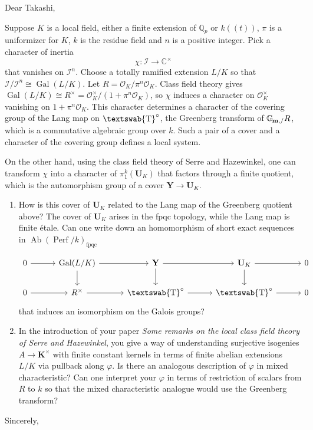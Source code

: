 \documentclass{letter}
\newcommand{\CC}{{\mathbb{C}}}
\newcommand{\OK}{\mathcal{O}_K}
\newcommand{\Qp}{\mathbb{Q}_p}
\newcommand{\mathswab}[1]{\operatorname{\textswab{#1}}}
\newcommand{\Gm}[1]{\mathbb{G}_{\hskip-1pt\textbf{m},#1}}
\newcommand{\GN}[1]{\mathswab{#1}}
\DeclareMathOperator{\Gal}{Gal}
\newcommand{\UK}{\mathbf{U}_K}
\newcommand{\Kx}{\mathbf{K}^\times}
\newcommand{\Y}{\mathbf{Y}}
\newcommand{\I}{\mathcal{I}}
\newcommand{\lp}{(\!(}
\newcommand{\rp}{)\!)}
\begin{document}
\begin{letter}{}
\opening{Dear Takashi,}

Suppose $K$ is a local field, either a finite extension of $\Qp$ or $k\lp t\rp$, $\pi$ is a uniformizer for $K$, $k$ is the residue field and $n$ is a positive integer.  Pick a character of inertia
\[
\chi : \I \to \CC^\times
\]
that vanishes on $\I^n$.  Choose a totally ramified extension $L/K$ so that $\I / \I^n \cong \Gal(L/K)$.  Let $R = \OK / \pi^n \OK$.  Class field theory gives $\Gal(L/K) \cong R^\times = \OK^\times / (1 + \pi^n\OK)$, so $\chi$ induces a character on $\OK^\times$ vanishing on $1 + \pi^n\OK$.  This character determines a character of the covering group of the Lang map on $\GN{T}^\circ$, the Greenberg transform of $\Gm / R$, which is a commutative algebraic group over $k$.  Such a pair of a cover and a character of the covering group defines a local system.

On the other hand, using the class field theory of Serre and Hazewinkel, one can transform $\chi$ into a character of $\pi_1^k(\UK)$ that factors through a finite quotient, which is the automorphism group of a cover $\Y \to \UK$.

\begin{enumerate}
\item How is this cover of $\UK$ related to the Lang map of the Greenberg quotient above?  The cover of $\UK$ arises in the fpqc topology, while the Lang map is finite \'etale.  Can one write down an homomorphism of short exact sequences in $\operatorname{Ab}(\operatorname{Perf}\!/k)_{\operatorname{fpqc}}$

\[
\begin{tikzcd}[column sep=30pt]
0 \rar & \Gal(L/K) \rar \dar & \Y \rar \dar & \UK \rar \dar & 0 \\
0 \rar & R^\times \rar & \GN{T}^\circ \rar & \GN{T}^\circ \rar & 0
\end{tikzcd}
\]
that induces an isomorphism on the Galois groups?

\item In the introduction of your paper \emph{Some remarks on the local class field theory of Serre and Hazewinkel}, you give a way of understanding surjective isogenies $A \to \Kx$ with finite constant kernels in terms of finite abelian extensions $L/K$ via pullback along $\varphi$.  Is there an analogous description of $\varphi$ in mixed characteristic?  Can one interpret your $\varphi$ in terms of restriction of scalars from $R$ to $k$ so that the mixed characteristic analogue would use the Greenberg transform?
\end{enumerate}


\closing{Sincerely,}
\end{letter}
\end{document}
